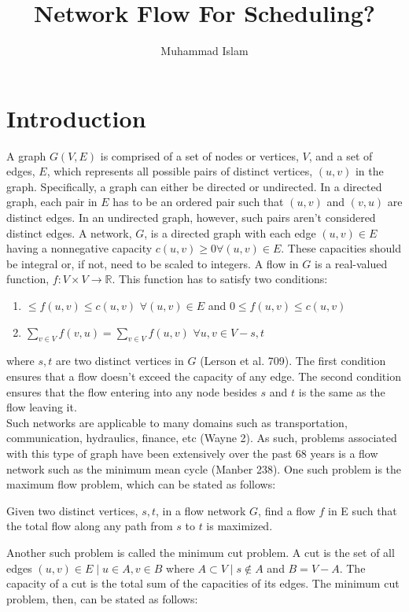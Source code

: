 \documentclass[11pt]{article}
\title{Network Flow For Scheduling?}
\author{Muhammad Islam}
\begin{document}
\maketitle
\section{Introduction}
A graph $G(V,E)$ is comprised of a set of nodes or vertices, $V$, and a set of edges, $E$, which represents all possible pairs of distinct vertices, $(u, v)$ in the graph. Specifically, a graph can either be directed or undirected. In a directed graph, each pair in $E$ has to be an ordered pair such that $(u,v)$ and $(v, u)$ are distinct edges. In an undirected graph, however, such pairs aren't considered distinct edges. A network, $G$, is a directed graph with each edge $(u, v) \in E$ having a nonnegative capacity $c(u, v) \geq 0 \forall (u, v) \in E$. These capacities should be integral or, if not, need to be scaled to integers. A flow in $G$ is a real-valued function, $f: V \times V \rightarrow \mathbb{R}$. This function has to satisfy two conditions:
\begin{enumerate}
\item $\leq f(u, v) \leq c(u,v)$  $\forall (u, v) \in E$ and $0 \leq f(u, v) \leq c(u,v)$  
\item $\sum_{v \in V} f(v, u) = \sum_{v \in V} f(u, v)$ $\forall u, v \in V - {s, t}$
\end{enumerate}
where $s, t$ are two distinct vertices in $G$ (Lerson et al. 709). The first condition ensures that a flow doesn't exceed the capacity of any edge. The second condition ensures that the flow entering into any node besides $s$ and $t$ is the same as the flow leaving it. \\
Such networks are applicable to many domains such as transportation, communication, hydraulics, finance, etc (Wayne 2). As such, problems associated with this type of graph have been extensively over the past 68 years is a flow network such as the minimum mean cycle  (Manber 238). One such problem is the maximum flow problem, which can be stated as follows:
\begin{tcolorbox}
	Given two distinct vertices, $s, t$, in a flow network $G$, find a flow $f$ in E such that the total flow along any path from $s$ to $t$ is maximized.  
\end{tcolorbox}
Another such problem is called the minimum cut problem. A cut is the set of all edges $(u, v) \in E \mid u \in A, v \in B$ where $A \subset V \mid s \not\in A$ and $B = V - A$. The capacity of a cut is the total sum of the capacities of its edges. The minimum cut problem, then, can be stated as follows:
\end{document}
